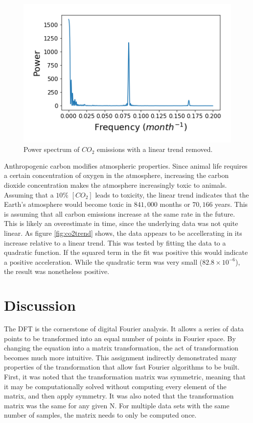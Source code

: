 \message{ !name(Assn2.tex)}\documentclass[twocolumn]{article}
\begin{document}
\begin{figure}
\centering
\includegraphics[width=\linewidth]{co2power}
\caption{Power spectrum of $CO_2$ emissions with a linear trend removed.}
\label{fig:co2power}
\end{figure}

Anthropogenic carbon modifies atmospheric properties. Since animal life requires a certain concentration of oxygen in the atmosphere, increasing the carbon dioxide concentration makes the atmosphere increasingly toxic to animals. Assuming that a $10\%$ $[CO_2]$ leads to toxicity, the linear trend indicates that the Earth's atmosphere would become toxic in $841,000$ months or $70,166$ years. This is assuming that all carbon emissions increase at the same rate in the future. This is likely an overestimate in time, since the underlying data was not quite linear. As figure \ref{fig:co2trend} shows, the data appears to be accellerating in its increase relative to a linear trend. This was tested by fitting the data to a quadratic function. If the squared term in the fit was positive this would indicate a positive acceleration. While the quadratic term was very small ($82.8 \times 10^{-6}$), the result was nonetheless positive. 

\section{Discussion}
The DFT is the cornerstone of digital Fourier analysis. It allows a series of data points to be transformed into an equal number of points in Fourier space. By changing the equation into a matrix transformation, the act of transformation becomes much more intuitive. This assignment indirectly demonstrated many properties of the transformation that allow fast Fourier algorithms to be built. First, it was noted that the transformation matrix was symmetric, meaning that it may be computationally solved without computing every element of the matrix, and then apply symmetry. It was also noted that the transformation matrix was the same for any given N. For multiple data sets with the same number of samples, the matrix needs to only be computed once. 
\end{document}
